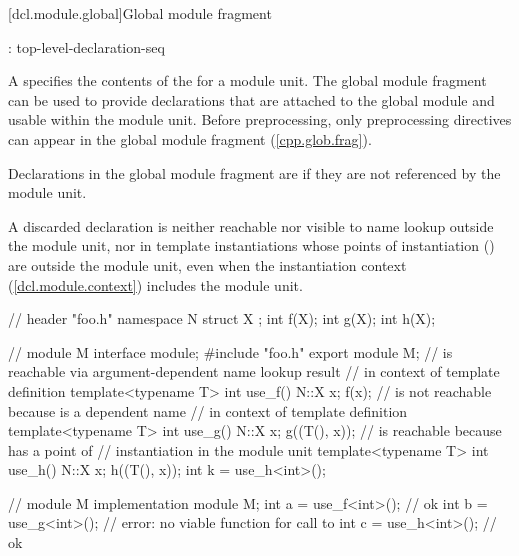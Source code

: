 [dcl.module.global]{Global module fragment}

\begin{std.txt}\color{addclr}
\begin{bnf}
:\br
     \terminal{;} top-level-declaration-seq
\end{bnf}

\resetalinea[0]
\alinea
A  specifies the contents of the
 for a module unit.
The global module fragment can be used to provide declarations
that are attached to the global module and usable within the module unit.
\enternote
Before preprocessing, only preprocessing directives can appear
in the global module fragment (\ref{cpp.glob.frag}).
\exitnote

\alinea
Declarations in the global module fragment are  if they
are not referenced by the module unit.
\begin{note}
A discarded declaration is neither reachable
nor visible to name lookup outside the module unit,
nor in template instantiations whose points of instantiation
() are outside the module unit,
even when the instantiation context (\ref{dcl.module.context})
includes the module unit.
\end{note}
\begin{example}
\begin{codeblock}
// header "foo.h"
namespace N {
  struct X {};
  int f(X);
  int g(X);
  int h(X);
}

// module M interface
module;
#include "foo.h"
export module M;
//  is reachable via argument-dependent name lookup result
// in context of template definition
template<typename T> int use_f() { N::X x; f(x); }
//  is not reachable because  is a dependent name
// in context of template definition
template<typename T> int use_g() { N::X x; g((T(), x)); }
//  is reachable because  has a point of
// instantiation in the module unit 
template<typename T> int use_h() { N::X x; h((T(), x)); }
int k = use_h<int>();

// module M implementation
module M;
int a = use_f<int>(); // ok
int b = use_g<int>(); // error: no viable function for call to 
int c = use_h<int>(); // ok
\end{codeblock}
\end{example}



\end{std.txt}
